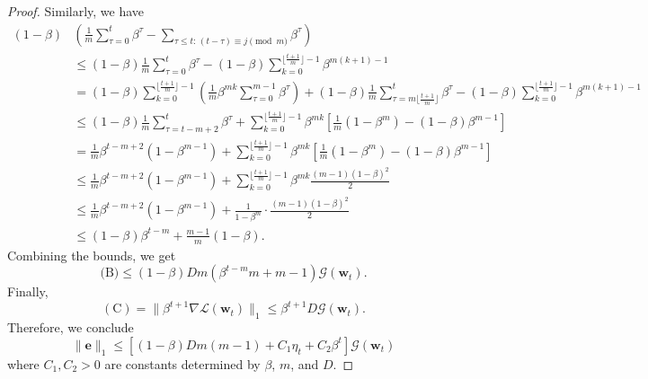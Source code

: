 \documentclass[10pt,a4paper]{amsart}
\def\be{{\mathbf e}}
\def\bw{{\mathbf w}}
\def\gG{{\mathcal{G}}}
\newcommand{\Ls}{\mathcal{L}}
\begin{document}
\begin{proof}
    Similarly, we have
    \begin{align*}
        (1-\beta) & \left(\frac 1m \sum_{\tau=0}^t \beta^\tau - \sum_{\tau\leq t:\, (t-\tau)\equiv j \pmod m}\beta^\tau \right) \\
        &\leq  (1-\beta) \frac 1m \sum_{\tau=0}^t \beta^\tau - (1-\beta) \sum_{k=0}^{\lfloor \tfrac{t+1}{m} \rfloor -1} \beta^{m(k+1)-1} \\
        &= (1-\beta) \sum_{k=0}^{\lfloor \tfrac{t+1}{m} \rfloor -1} \left( \frac 1m \beta^{mk} \sum_{\tau=0}^{m-1} \beta^\tau  \right) + (1-\beta) \frac 1m \sum_{\tau = m\lfloor \tfrac{t+1}{m} \rfloor}^t \beta^\tau - (1-\beta) \sum_{k=0}^{\lfloor \tfrac{t+1}{m} \rfloor -1} \beta^{m(k+1)-1} \\
        & \leq  (1-\beta) \frac 1m \sum_{\tau = t-m+2}^t \beta^\tau +  \sum_{k=0}^{\lfloor \tfrac{t+1}{m} \rfloor -1} \beta^{mk} \left[\frac 1m (1-\beta^m) - (1-\beta) \beta^{m-1} \right] \\
        &=  \frac{1}{m}\beta^{t-m+2}(1-\beta^{m-1}) +  \sum_{k=0}^{\lfloor \tfrac{t+1}{m} \rfloor -1} \beta^{mk} \left[\frac 1m (1-\beta^m) - (1-\beta) \beta^{m-1} \right] \\
        &\leq \frac{1}{m}\beta^{t-m+2}(1-\beta^{m-1}) + \sum_{k=0}^{\lfloor \tfrac{t+1}{m} \rfloor -1} \beta^{mk} \frac{(m-1)(1-\beta)^2}{2} \\
        &\leq \frac{1}{m}\beta^{t-m+2}(1-\beta^{m-1}) + \frac{1}{1-\beta^m} \cdot \frac{(m-1)(1-\beta)^2}{2}  \\
        &\leq (1-\beta)\beta^{t-m} + \frac{m-1}{m} (1-\beta) .
    \end{align*}
    Combining the bounds, we get
    \[
    \textrm{(B)} \leq (1-\beta) Dm (\beta^{t-m}m+m-1) \gG(\bw_t).
    \]
    Finally,
    \[
    \mathrm{(C)} = \|\beta^{t+1} \nabla \Ls (\bw_t)\|_1 \leq \beta^{t+1} D \gG(\bw_t).
    \]
    Therefore, we conclude
    \[
    \|\be\|_1 \leq  \left[ (1-\beta)Dm(m-1) + C_1\eta_t + C_2 \beta^t \right] \gG(\bw_t)
    \]
    where $C_1, C_2>0$ are constants determined by $\beta$, $m$, and $D$.
\end{proof}
\end{document}
